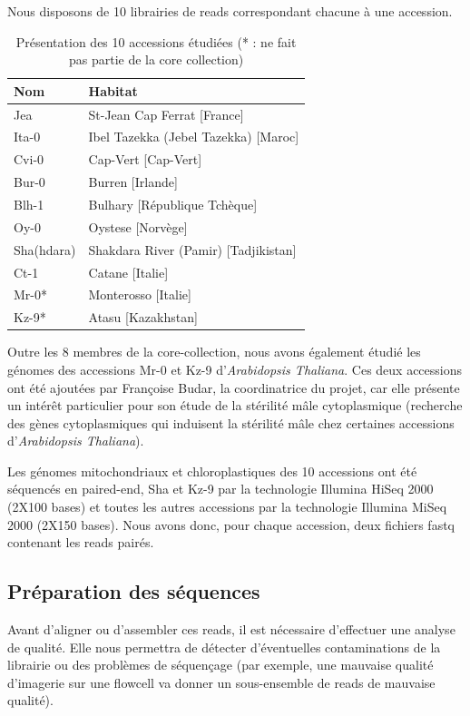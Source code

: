 \documentclass[a4paper]{article}
\begin{document}
Nous disposons de 10 librairies de reads correspondant chacune à une accession. 

\begin{table}[!ht]
\centering
\begin{tabular}{|l|l|}
\hline
   Nom & Habitat \\
   \hline
   Jea & St-Jean Cap Ferrat [France] \\
   Ita-0 & Ibel Tazekka (Jebel Tazekka) [Maroc] \\
   Cvi-0 & Cap-Vert [Cap-Vert] \\
   Bur-0 & Burren [Irlande] \\
   Blh-1 & Bulhary [République Tchèque] \\
   Oy-0 & Oystese [Norvège] \\
   Sha(hdara) & Shakdara River (Pamir) [Tadjikistan] \\
   Ct-1 & Catane [Italie] \\
   Mr-0* & Monterosso [Italie] \\
   Kz-9* & Atasu [Kazakhstan] \\
   \hline
\end{tabular}
\label{donnees}
\caption{Présentation des 10 accessions étudiées (* : ne fait pas partie de la core collection)}
\end{table}

Outre les 8 membres de la core-collection, nous avons également étudié les génomes des accessions Mr-0 et Kz-9 d'\textit{Arabidopsis Thaliana}. Ces deux accessions ont été ajoutées par Françoise Budar, la coordinatrice du projet, car elle présente un intérêt particulier pour son étude de la stérilité mâle cytoplasmique (recherche des gènes cytoplasmiques qui induisent la stérilité mâle chez certaines accessions d'\textit{Arabidopsis Thaliana}). 

Les génomes mitochondriaux et chloroplastiques des 10 accessions ont été séquencés en paired-end, Sha et Kz-9 par la technologie Illumina HiSeq 2000 (2X100 bases) et toutes les autres accessions par la technologie Illumina MiSeq 2000 (2X150 bases). Nous avons donc, pour chaque accession, deux fichiers fastq contenant les reads pairés. 

\subsection{Préparation des séquences}

Avant d'aligner ou d'assembler ces reads, il est nécessaire d'effectuer une analyse de qualité. Elle nous permettra de détecter d'éventuelles contaminations de la librairie ou des problèmes de séquençage (par exemple, une mauvaise qualité d'imagerie sur une flowcell va donner un sous-ensemble de reads de mauvaise qualité).
\end{document}

